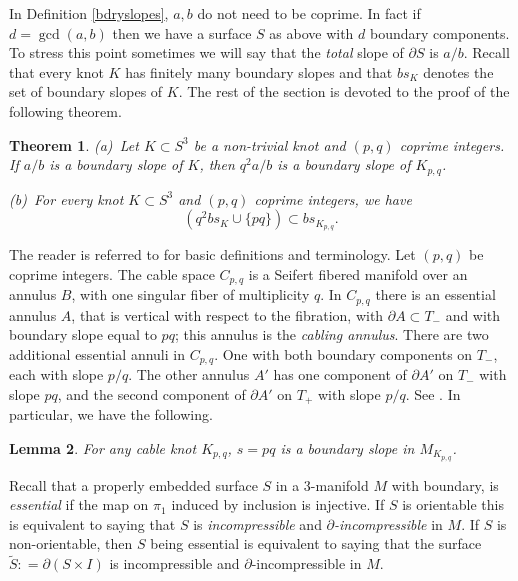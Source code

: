 \documentclass[11pt]{amsart}
\newtheorem{theorem}{Theorem}[section]
\newtheorem{lemma}[theorem]{Lemma}
\theoremstyle{definition}
\newcommand{\bdy}{{\partial}}
\newcommand{\M}{M_{K_{p,q}}}
\newcommand{\C}{{C_{p, q}}}
\newcommand{\K}{{K_{p, q}}}
\begin{document}
In Definition \ref{bdryslopes},  $a, b$  do not need to be coprime.
In fact if $d=\gcd(a, b)$ then we have a surface $S$ as above with $d$ boundary components.
To stress this point sometimes we will say that the \emph{total} slope of $\partial S$ is $a/b$.
Recall that every knot $K$ has finitely many boundary slopes and that
$bs_K$ denotes the set of boundary slopes of $K$.
The rest of the section is devoted to the proof of the following theorem.

\begin{theorem} 
 \label{main:bs} 
 (a)\ Let $K \subset S^3$  be a non-trivial knot and $(p, q)$ coprime  integers.
If $a/b$ is a boundary slope of $K$, then
$q^2 a/b$ is a boundary slope of ${K_{p,q}}$. 
\smallskip

\smallskip

(b)\ For every knot $K \subset S^3$ and $(p, q)$ coprime  integers,
we have 
 $$\left( q^2 bs_K \cup \{pq\} \right) \subset bs_{K_{p,q}}.$$
\end{theorem}

\smallskip


The reader is referred to 
\cite{Ha, hempel} for basic definitions and terminology. 
Let $(p, q)$ be coprime integers.
The cable space $\C$ is a Seifert fibered manifold over an annulus $B$, with one singular fiber of multiplicity $q$. 
In $\C$ there is an essential annulus $A$, that is vertical with respect to the fibration,  with $\bdy A \subset T_{-}$ and with boundary slope equal
to $pq$; this annulus is the \emph{cabling annulus}. 
There are two additional essential annuli in $\C$. One with both boundary components on $T_{-}$, each with slope
$p/q$. The other annulus 
 $A'$ has one component of $\bdy A'$ on $T_{-}$ with slope $pq$, and the second component of $\bdy A'$
on $T_{+}$ with slope $p/q$. See \cite{GL}. In particular, we have the following.
\begin{lemma} \label{cannulus} For any cable knot $\K$, $s=pq$ is a boundary slope in $\M$.

\end{lemma}


Recall that a properly embedded surface $S$ in a 3-manifold  $M$ with boundary, is \emph{essential}
if the map on $\pi_1$ induced by inclusion is injective. If $S$ is orientable
this is equivalent to saying that $S$ is \emph{incompressible} and \emph{ $\partial$-incompressible}
in $M$. If $S$ is non-orientable, then $S$ being essential is  equivalent 
to saying that  the surface $\widetilde{S}: =\partial(S\times I )$ is incompressible and $\partial$-incompressible 
in  $M$.
\end{document}
